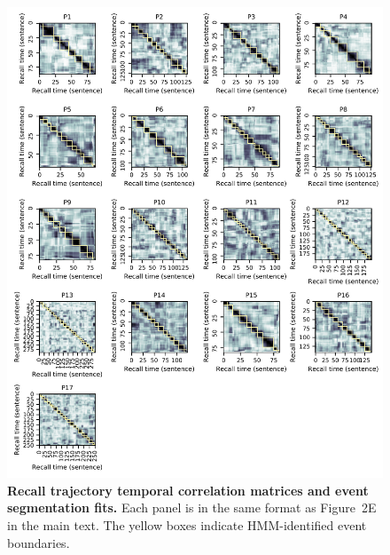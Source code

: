 \documentclass{article}
\begin{document}
\begin{figure}[htp]
\centering
\includegraphics[width=\textwidth]{figs/corrmats}
\caption{\small \textbf{Recall trajectory temporal correlation matrices and event segmentation fits.} Each panel is in the same format as Figure~2E in the main text.  The yellow boxes indicate HMM-identified event boundaries.}
\label{fig:corrmats}
\end{figure}
\end{document}
